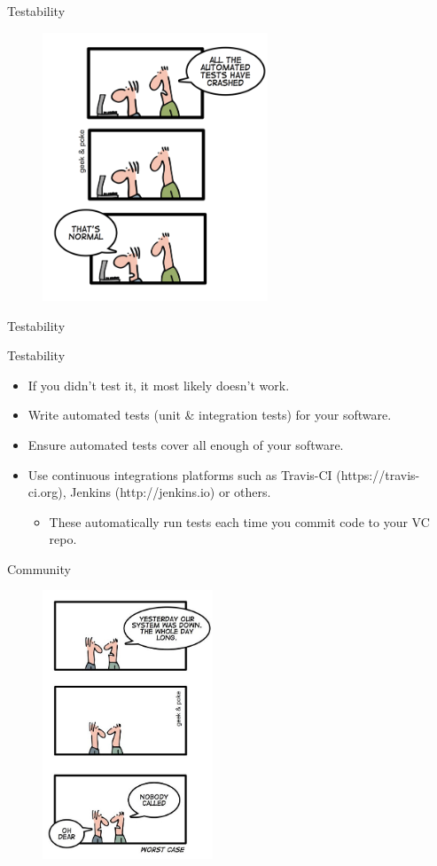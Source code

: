 \documentclass[compress]{beamer}
\begin{document}
\begin{frame}{Testability}
\begin{figure}
\includegraphics[height=8cm]{img/test.png}
\end{figure}
\end{frame}

\begin{frame}{Testability}
    \begin{block}{Testability}
        \begin{itemize}
        \item If you didn't test it, it most likely doesn't work.
        \item Write automated tests (unit \& integration tests) for your software.
        \item Ensure automated tests cover all enough of your software.
        \item Use continuous integrations platforms such as Travis-CI (https://travis-ci.org), Jenkins (http://jenkins.io) or others.
            \begin{itemize}
                \item These automatically run tests each time you commit code to your VC repo.
            \end{itemize}
        \end{itemize}
    \end{block}
\end{frame}

\begin{frame}{Community}
\begin{figure}
\includegraphics[height=8cm]{img/community.jpg}
\end{figure}
\end{frame}
\end{document}
